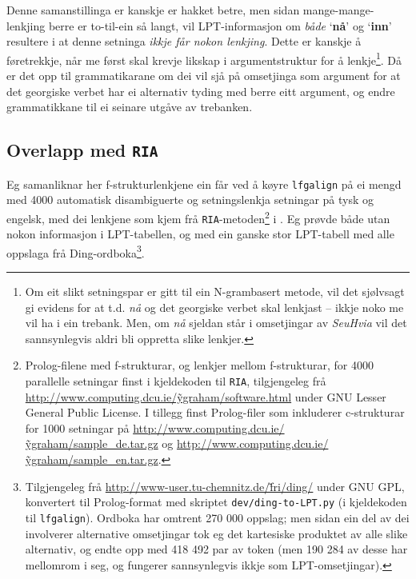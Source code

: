\documentclass[11pt,a4paper,oneside,draft]{report}
\newcommand{\p}[1]{`\textbf{#1}'}
\begin{document}
Denne samanstillinga er kanskje er hakket betre, men sidan
mange-mange-lenkjing berre er to-til-ein så langt, vil LPT-informasjon
om \emph{både} \p{nå} og \p{inn} resultere i at denne setninga \emph{ikkje får nokon lenkjing}. Dette er kanskje å føretrekkje, når me først skal
krevje likskap i argumentstruktur for å lenkje\footnote{Om eit slikt setningspar er gitt til ein N-grambasert metode,
        vil det sjølvsagt gi evidens for at t.d. \emph{nå} og det georgiske
        verbet skal lenkjast -- ikkje noko me vil ha i ein
        trebank. Men, om \emph{nå} sjeldan står i omsetjingar av \emph{SeuHvia}
        vil det sannsynlegvis aldri bli oppretta slike lenkjer. }. Då er det opp
til grammatikarane om dei vil sjå på omsetjinga som argument for at
det georgiske verbet har ei alternativ tyding med berre eitt argument,
og endre grammatikkane til ei seinare utgåve av trebanken.


\subsection{Overlapp med \texttt{RIA}}
\label{sec-5.3.2}

\label{SEC:ria}

Eg samanliknar her f-strukturlenkjene ein får ved å køyre \texttt{lfgalign}
på ei mengd med 4000 automatisk disambiguerte og setningslenkja
setningar på tysk og engelsk, med dei lenkjene som kjem frå
\texttt{RIA}-metoden\footnote{Prolog-filene med f-strukturar, og lenkjer mellom
        f-strukturar, for 4000 parallelle setningar finst i
        kjeldekoden til \texttt{RIA}, tilgjengeleg frå
        \href{http://www.computing.dcu.ie/~ygraham/software.html}{http://www.computing.dcu.ie/\~ygraham/software.html} under GNU
        Lesser General Public License. I tillegg finst Prolog-filer
        som inkluderer c-strukturar for 1000 setningar på
        \href{http://www.computing.dcu.ie/~ygraham/sample_de.tar.gz}{http://www.computing.dcu.ie/\~ygraham/sample\_de.tar.gz} og
        \href{http://www.computing.dcu.ie/~ygraham/sample_en.tar.gz}{http://www.computing.dcu.ie/\~ygraham/sample\_en.tar.gz}. } i \citet{graham2009osr,graham2009fts}. Eg prøvde
både utan nokon informasjon i LPT-tabellen, og med ein ganske stor
LPT-tabell med alle oppslaga frå Ding-ordboka\footnote{Tilgjengeleg frå \href{http://www-user.tu-chemnitz.de/~fri/ding/}{http://www-user.tu-chemnitz.de/\~fri/ding/}
        under GNU GPL, konvertert til Prolog-format med skriptet
        \texttt{dev/ding-to-LPT.py} (i kjeldekoden til \texttt{lfgalign}).  Ordboka
        har omtrent 270 000 oppslag; men sidan ein del av dei
        involverer alternative omsetjingar tok eg det kartesiske
        produktet av alle slike alternativ, og endte opp med 418 492
        par av token (men 190 284 av desse har mellomrom i seg, og
        fungerer sannsynlegvis ikkje som LPT-omsetjingar). }.
\end{document}
